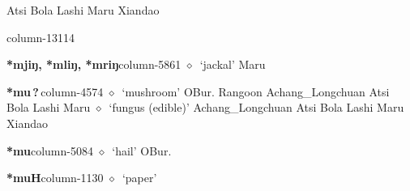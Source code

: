 \hspace{1ex}
         Atsi 
\hspace{1ex}
         Bola 
\hspace{1ex}
         Lashi 
\hspace{1ex}
         Maru 
\hspace{1ex}
         Xiandao 
  \item {\footnotesize \textbf{}}{\tiny column-13114}
  \item {\footnotesize \textbf{*mjiŋ, *mliŋ, *mriŋ}}{\tiny column-5861}
         $\diamond$~`jackal'
         Maru 
  \item {\footnotesize \textbf{*mu\,?\,}}{\tiny column-4574}
         $\diamond$~`mushroom'
         OBur. 
\hspace{1ex}
         Rangoon 
\hspace{1ex}
         Achang\_Longchuan 
\hspace{1ex}
         Atsi 
\hspace{1ex}
         Bola 
\hspace{1ex}
         Lashi 
\hspace{1ex}
         Maru 
\hspace{1ex}
         $\diamond$~`fungus (edible)'
         Achang\_Longchuan 
\hspace{1ex}
         Atsi 
\hspace{1ex}
         Bola 
\hspace{1ex}
         Lashi 
\hspace{1ex}
         Maru 
\hspace{1ex}
         Xiandao 
  \item {\footnotesize \textbf{*mu}}{\tiny column-5084}
         $\diamond$~`hail'
         OBur. 
  \item {\footnotesize \textbf{*muH}}{\tiny column-1130}
         $\diamond$~`paper'
